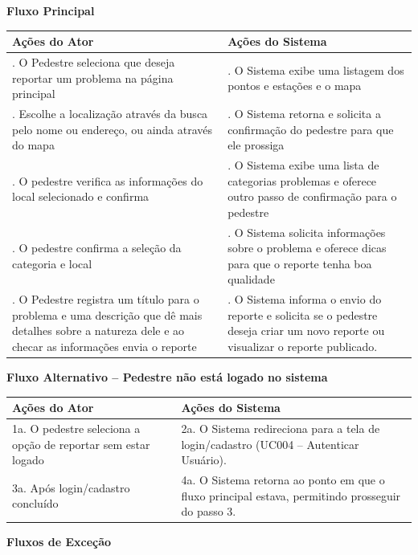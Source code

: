 \documentclass[12pt,a4paper]{article}
\begin{document}
\textbf{Fluxo Principal}

\begin{longtable}{|>{\raggedright\arraybackslash}p{7cm}|>{\raggedright\arraybackslash}p{7cm}|}
\hline
\textbf{Ações do Ator} & \textbf{Ações do Sistema} \\
\hline
1. O Pedestre seleciona que deseja reportar um problema na página principal & 2. O Sistema exibe uma listagem dos pontos e estações e o mapa \\
\hline
3. Escolhe a localização através da busca pelo nome ou endereço, ou ainda através do mapa & 4. O Sistema retorna e solicita a confirmação do pedestre para que ele prossiga \\
\hline
5. O pedestre verifica as informações do local selecionado e confirma & 6. O Sistema exibe uma lista de categorias problemas e oferece outro passo de confirmação para o pedestre \\
\hline
7. O pedestre confirma a seleção da categoria e local & 8. O Sistema solicita informações sobre o problema e oferece dicas para que o reporte tenha boa qualidade \\
\hline
9. O Pedestre registra um título para o problema e uma descrição que dê mais detalhes sobre a natureza dele e ao checar as informações envia o reporte & 10. O Sistema informa o envio do reporte e solicita se o pedestre deseja criar um novo reporte ou visualizar o reporte publicado. \\
\hline
\end{longtable}

\textbf{Fluxo Alternativo – Pedestre não está logado no sistema}

\begin{longtable}{|>{\raggedright\arraybackslash}p{7cm}|>{\raggedright\arraybackslash}p{7cm}|}
\hline
\textbf{Ações do Ator} & \textbf{Ações do Sistema} \\
\hline
1a. O pedestre seleciona a opção de reportar sem estar logado & 2a. O Sistema redireciona para a tela de login/cadastro (UC004 – Autenticar Usuário). \\
\hline
3a. Após login/cadastro concluído & 4a. O Sistema retorna ao ponto em que o fluxo principal estava, permitindo prosseguir do passo 3. \\
\hline
\end{longtable}

\textbf{Fluxos de Exceção}
\end{document}
